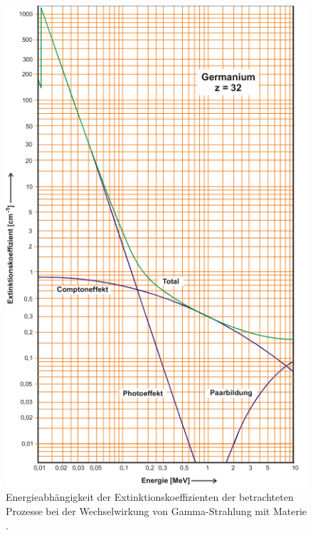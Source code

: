 \begin{figure}
  \includegraphics[width=\textwidth]{content/skizzen/extinktion.png}
  \caption{Energieabhängigkeit der Extinktionskoeffizienten der betrachteten Prozesse bei der Wechselwirkung von Gamma-Strahlung mit Materie \cite{sample}.}
  \label{fig:extinktion}
\end{figure}
\FloatBarrier

